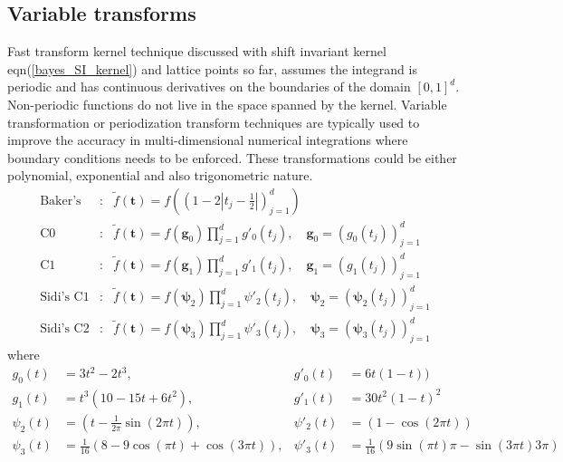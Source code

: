 \documentclass[twocolumn]{svjour3}          %
\newcommand{\bm}[1]{\boldsymbol{#1}}
\newcommand{\vg}{\bm{g}}
\newcommand{\vt}{\bm{t}}
\def\abs#1{\ensuremath{\left \lvert #1 \right \rvert}}
\begin{document}
\subsection{Variable transforms}
Fast transform kernel technique discussed with shift invariant kernel eqn(\ref{bayes_SI_kernel}) and lattice points so far, assumes the integrand is periodic and has continuous derivatives on the boundaries of the domain $[0,1]^d$. Non-periodic functions do not live in the space spanned by the kernel.
Variable transformation or periodization transform techniques are typically used to improve the accuracy in multi-dimensional numerical integrations where boundary conditions needs to be enforced. These transformations could be either polynomial, exponential and also trigonometric nature.
\begin{eqnarray}
\text{Baker's} & : & \tilde{f}(\vt) 
= f\left( \left(1-2 \abs{t_j-\frac{1}{2}} \right)_{j=1}^d \right) 
\\
\text{C0} & : & \tilde{f}(\vt) 
= f\left( \vg_0 \right)\prod_{j=1}^d g'_0(t_j), 
  \quad \vg_0 = \left( g_0(t_j) \right)_{j=1}^d
\\
\text{C1} & : & \tilde{f}(\vt) 
= f\left( \vg_1\right)\prod_{j=1}^d g'_1(t_j),
  \quad \vg_1 = \left( g_1(t_j) \right)_{j=1}^d 
\\
\text{Sidi's C1} & : & \tilde{f}(\vt) 
= f\left( \bm{\psi}_2 \right) \prod_{j=1}^d \psi'_2(t_j),
  \quad \bm{\psi}_2 = \left( \bm{\psi}_2(t_j) \right)_{j=1}^d
\\
\text{Sidi's C2} & : & \tilde{f}(\vt) 
= f\left( \bm{\psi}_3 \right) \prod_{j=1}^d \psi'_3(t_j),
  \quad \bm{\psi}_3 = \left( \bm{\psi}_3(t_j) \right)_{j=1}^d
\end{eqnarray}
where
\begin{align*}
g_0(t) &= 3 t^2 - 2 t^3,  & g'_0(t) &= 6t(1-t))
\\
g_1(t) &= t^3(10-15t+6t^2),  & g'_1(t) &= 30t^2(1-t)^2
\\
\psi_2(t)   &= 
\left(t - \frac{1}{2\pi} \sin(2\pi t) \right) 
, &
\psi'_2(t) &= 
\left(1 - \cos(2 \pi t)  \right) 
\\
\psi_3(t)   &= 
\frac{1}{16} \left(8-9\cos(\pi t)+ \cos(3\pi t) \right) 
, & 
\psi'_3(t) &= 
\frac{1}{16} \left(9 \sin(\pi t) \pi - \sin(3 \pi t) 3 \pi \right) 
\end{align*}
\end{document}
